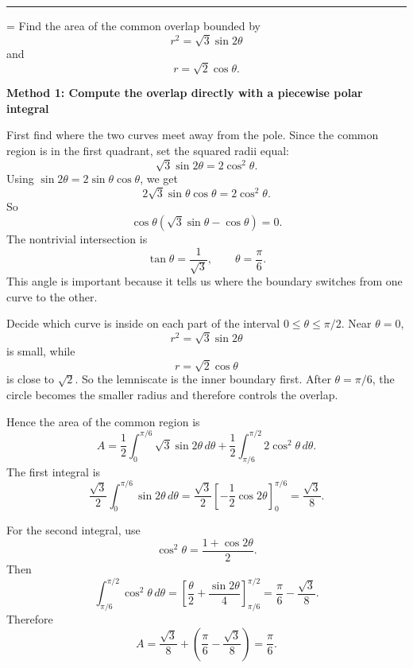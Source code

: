 \documentclass[a4paper,12pt,twocolumn]{article}
\newlength{\problemnumberwidth}
\newenvironment{solutionbox}{\begin{framed}}{\end{framed}}
\newcommand{\sectiontitle}[2]{%
  \hypertarget{#1}{}%
  \par\vspace{0.8em}%
  \noindent{\Large\bfseries #2}\par
  \vspace{0.3em}%
  \hrule
  \vspace{0.8em}%
}
\newcommand{\problem}[3]{%
  \Needspace{10\baselineskip}%
  \phantomsection\label{#1}%
  \par\vspace{0.8em}%
  \noindent
  \hangindent=\problemnumberwidth
  \hangafter=1
  \makebox[\problemnumberwidth][l]{\textbf{#2.}}#3\par
}
\begin{document}
\sectiontitle{sec:10-4}{10-4}

\problem{prob:10-4-44}{44}{Find the area of the common overlap bounded by
\[
r^2=\sqrt3\sin 2\theta
\]
and
\[
r=\sqrt2\cos\theta.
\]}

\begin{solutionbox}
\textbf{Method 1: Compute the overlap directly with a piecewise polar integral}

\begin{steps}
\item First find where the two curves meet away from the pole. Since the common region is in the first quadrant, set the squared radii equal:
\[
\sqrt3\sin 2\theta=2\cos^2\theta.
\]
Using \(\sin 2\theta=2\sin\theta\cos\theta\), we get
\[
2\sqrt3\sin\theta\cos\theta=2\cos^2\theta.
\]
So
\[
\cos\theta(\sqrt3\sin\theta-\cos\theta)=0.
\]
The nontrivial intersection is
\[
\tan\theta=\frac{1}{\sqrt3},
\qquad
\theta=\frac{\pi}{6}.
\]
This angle is important because it tells us where the boundary switches from one curve to the other.

\item Decide which curve is inside on each part of the interval \(0\le\theta\le\pi/2\). Near \(\theta=0\),
\[
r^2=\sqrt3\sin 2\theta
\]
is small, while
\[
r=\sqrt2\cos\theta
\]
is close to \(\sqrt2\). So the lemniscate is the inner boundary first. After \(\theta=\pi/6\), the circle becomes the smaller radius and therefore controls the overlap.

\item Hence the area of the common region is
\[
A=\frac12\int_0^{\pi/6}\sqrt3\sin 2\theta\,d\theta
+\frac12\int_{\pi/6}^{\pi/2}2\cos^2\theta\,d\theta.
\]
The first integral is
\[
\frac{\sqrt3}{2}\int_0^{\pi/6}\sin 2\theta\,d\theta
=\frac{\sqrt3}{2}\left[-\frac12\cos 2\theta\right]_0^{\pi/6}
=\frac{\sqrt3}{8}.
\]

\item For the second integral, use
\[
\cos^2\theta=\frac{1+\cos 2\theta}{2}.
\]
Then
\[
\int_{\pi/6}^{\pi/2}\cos^2\theta\,d\theta
=\left[\frac{\theta}{2}+\frac{\sin 2\theta}{4}\right]_{\pi/6}^{\pi/2}
=\frac{\pi}{6}-\frac{\sqrt3}{8}.
\]
Therefore
\[
A=\frac{\sqrt3}{8}+\left(\frac{\pi}{6}-\frac{\sqrt3}{8}\right)
=\frac{\pi}{6}.
\]
\end{steps}
\end{solutionbox}
\end{document}
